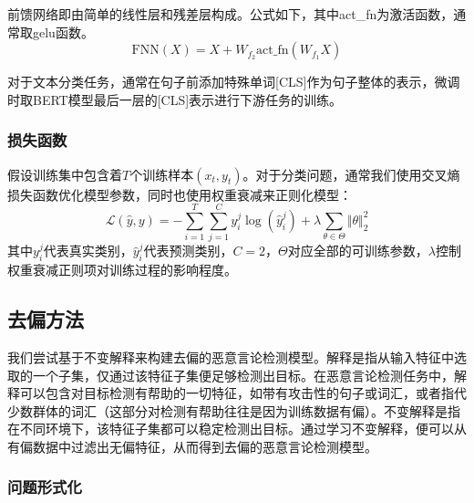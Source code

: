 前馈网络即由简单的线性层和残差层构成。公式如下，其中act\_fn为激活函数，通常取gelu函数。
\begin{equation}
    \text{FNN}(X) = X + W_{f_2}\text{act\_fn}(W_{f_1}X)
\end{equation}

对于文本分类任务，通常在句子前添加特殊单词[CLS]作为句子整体的表示，微调时取BERT模型最后一层的[CLS]表示进行下游任务的训练。

\subsubsection{损失函数}

假设训练集中包含着$T$个训练样本$(x_t,y_t)$。对于分类问题，通常我们使用交叉熵损失函数优化模型参数，同时也使用权重衰减来正则化模型：
\begin{equation}
     \mathcal{L}(\hat{y},y)=-\sum_{i=1}^T\sum_{j=1}^Cy_i^j\log(\hat{y}_i^j)+\lambda\sum_{\theta\in\Theta}\Vert\theta\Vert_2^2
\end{equation}
其中$y_i^j$代表真实类别，$\hat{y}_i^j$代表预测类别，$C=2$，$\Theta$对应全部的可训练参数，$\lambda$控制权重衰减正则项对训练过程的影响程度。

\subsection{去偏方法}

我们尝试基于不变解释\cite{chang2020invariant}来构建去偏的恶意言论检测模型。解释是指从输入特征中选取的一个子集，仅通过该特征子集便足够检测出目标。在恶意言论检测任务中，解释可以包含对目标检测有帮助的一切特征，如带有攻击性的句子或词汇，或者指代少数群体的词汇（这部分对检测有帮助往往是因为训练数据有偏）。不变解释是指在不同环境下，该特征子集都可以稳定检测出目标。通过学习不变解释，便可以从有偏数据中过滤出无偏特征，从而得到去偏的恶意言论检测模型。

\subsubsection{问题形式化}

